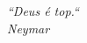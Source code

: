 \thispagestyle{empty}
\vspace*{\fill}
\begin{flushright}
	\textit{``Deus é top.``\\
	            Neymar
	 }
\end{flushright}
\setcounter{footnote}{0}%
